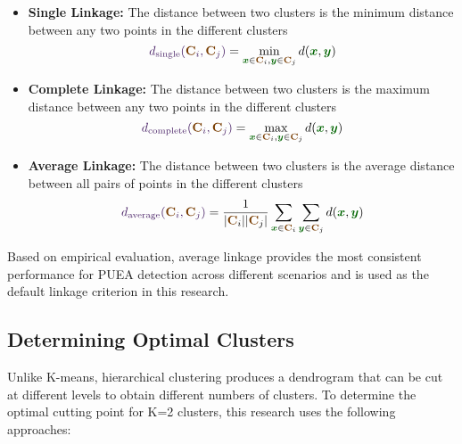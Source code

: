 \begin{tcolorbox}[enhanced, colback=orange!5, colframe=orange!75!black, 
title=Hierarchical Clustering Linkage Criteria]
\begin{itemize}
    \item \textbf{Single Linkage:} The distance between two clusters is the minimum distance between any two points in the different clusters
    \begin{equation}
        \formula{d_{\text{single}}(\matrix{C}_i, \matrix{C}_j)} = \min_{\vector{x} \in \matrix{C}_i, \vector{y} \in \matrix{C}_j} d(\vector{x}, \vector{y})
    \end{equation}
    
    \item \textbf{Complete Linkage:} The distance between two clusters is the maximum distance between any two points in the different clusters
    \begin{equation}
        \formula{d_{\text{complete}}(\matrix{C}_i, \matrix{C}_j)} = \max_{\vector{x} \in \matrix{C}_i, \vector{y} \in \matrix{C}_j} d(\vector{x}, \vector{y})
    \end{equation}
    
    \item \textbf{Average Linkage:} The distance between two clusters is the average distance between all pairs of points in the different clusters
    \begin{equation}
        \formula{d_{\text{average}}(\matrix{C}_i, \matrix{C}_j)} = \frac{1}{|\matrix{C}_i||\matrix{C}_j|}\sum_{\vector{x} \in \matrix{C}_i}\sum_{\vector{y} \in \matrix{C}_j} d(\vector{x}, \vector{y})
    \end{equation}
\end{itemize}
\end{tcolorbox}

Based on empirical evaluation, average linkage provides the most consistent performance for PUEA detection across different scenarios and is used as the default linkage criterion in this research.

\subsection{Determining Optimal Clusters}

Unlike K-means, hierarchical clustering produces a dendrogram that can be cut at different levels to obtain different numbers of clusters. To determine the optimal cutting point for K=2 clusters, this research uses the following approaches:

